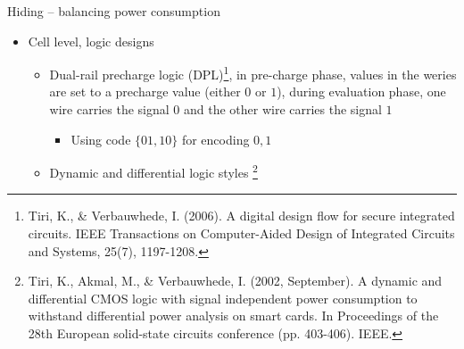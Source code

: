 \begin{frame}{Hiding -- balancing power consumption}
    \begin{itemize}
        \item Cell level, logic designs
        \begin{itemize}
            \item Dual-rail precharge logic (DPL)\footnote{Tiri, K., \& Verbauwhede, I. (2006). A digital design flow for secure integrated circuits. IEEE Transactions on Computer-Aided Design of Integrated Circuits and Systems, 25(7), 1197-1208.}, in pre-charge phase, values in the weries are set to a precharge value (either $0$ or $1$), during evaluation phase, one wire carries the signal $0$ and the other wire carries the signal $1$
            \begin{itemize}
                \item Using code $\{01,10\}$ for encoding $0,1$
            \end{itemize}
            \item Dynamic and differential logic styles \footnote{Tiri, K., Akmal, M., \& Verbauwhede, I. (2002, September). A dynamic and differential CMOS logic with signal independent power consumption to withstand differential power analysis on smart cards. In Proceedings of the 28th European solid-state circuits conference (pp. 403-406). IEEE.}
        \end{itemize}
    \end{itemize}
\end{frame}

